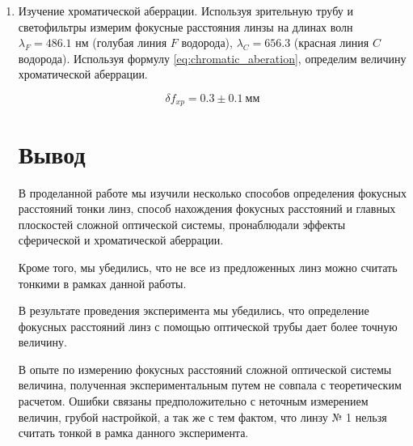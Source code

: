 \begin{enumerate}
		
		\item Изучение хроматической аберрации. Используя зрительную трубу и светофильтры измерим фокусные расстояния линзы на длинах волн $\lambda_F = 486.1$ нм (голубая линия $F$ водорода), $\lambda_C = 656.3$ (красная линия $C$ водорода). Используя формулу \eqref{eq:chromatic_aberation}, определим величину хроматической аберрации.
		
		\[ \delta f_{xp} = 0.3 \pm 0.1 ~ \text{мм} \] 
		
		\section*{Вывод}
		
		В проделанной работе мы изучили несколько способов определения фокусных расстояний тонки линз, способ нахождения фокусных расстояний и главных плоскостей сложной оптической системы, пронаблюдали эффекты сферической и хроматической аберрации. 
		
		Кроме того, мы убедились, что не все из предложенных линз можно считать тонкими в рамках данной работы.
		
		В результате проведения эксперимента мы убедились, что определение фокусных расстояний линз с помощью оптической трубы дает более точную величину.
		
		В опыте по измерению фокусных расстояний сложной оптической системы величина, полученная экспериментальным путем не совпала с теоретическим расчетом. Ошибки связаны предположительно с неточным измерением величин, грубой настройкой, а так же с тем фактом, что линзу № 1 нельзя считать тонкой в рамка данного эксперимента.  
		
	\end{enumerate}
	
